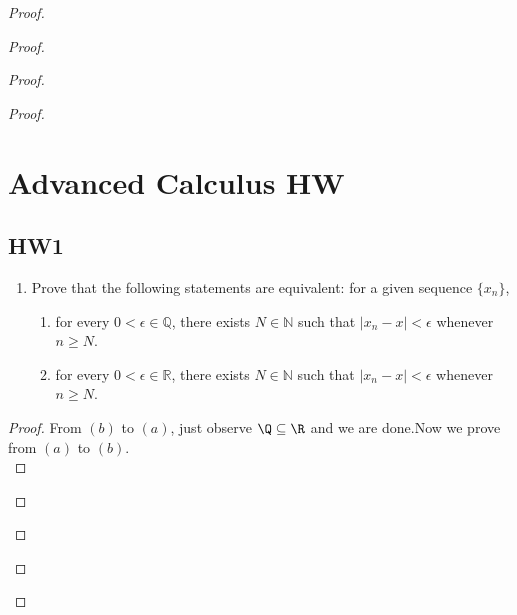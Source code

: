 \documentclass{report}
\begin{document}
\begin{proof}
\begin{proof}
\begin{proof}
\begin{proof}
\chapter{Advanced Calculus HW}
\section{HW1}
\begin{question}{}{}
\begin{enumerate}
    \item Prove that the following statements are equivalent: for a given sequence $\{x_n\}$,
    \begin{enumerate}
        \item for every $0 < \epsilon \in \mathbb{Q}$, there exists $N \in \mathbb{N}$ such that $|x_n - x| < \epsilon$ whenever $n \geq N$.
        \item for every $0 < \epsilon \in \mathbb{R}$, there exists $N \in \mathbb{N}$ such that $|x_n - x| < \epsilon$ whenever $n \geq N$.
    \end{enumerate}
\end{enumerate}
\end{question}
\begin{proof}
From $(b)$ to $(a)$, just observe  $\Q \subseteq \R$ and we are done.Now we prove from $(a)$ to $(b)$.\\


\end{proof}
\end{proof}
\end{proof}
\end{proof}
\end{proof}
\end{document}

